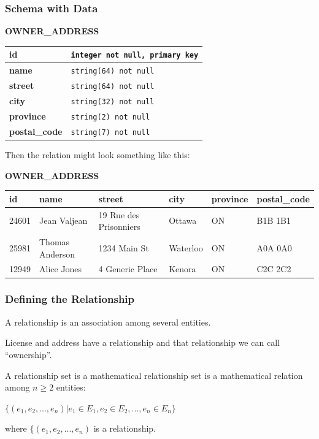 \begin{frame}
\frametitle{Schema with Data}

\begin{center}
		\textbf{OWNER\_ADDRESS}\\
	\begin{tabular}{|l|l|}\hline
		\textbf{id} & \texttt{integer not null,  primary key}\\ \hline
		\textbf{name} & \texttt{string(64) not null}\\ \hline
		\textbf{street} & \texttt{string(64) not null}\\ \hline
		\textbf{city} & \texttt{string(32) not null}\\ \hline
		\textbf{province} & \texttt{string(2) not null}\\ \hline
		\textbf{postal\_code} & \texttt{string(7) not null}\\ \hline

	\end{tabular}
\end{center}

Then the relation might look something like this:
{\scriptsize
\begin{center}
		\textbf{OWNER\_ADDRESS}\\
	\begin{tabular}{|l|l|l|l|l|l|}\hline
		\textbf{id} & \textbf{name} &\textbf{street} & \textbf{city} & \textbf{province} & \textbf{postal\_code} \\ \hline
		24601 & Jean Valjean & 19 Rue des Prisonniers & Ottawa & ON & B1B 1B1\\ \hline
		25981 & Thomas Anderson & 1234 Main St & Waterloo & ON & A0A 0A0\\ \hline
		12949 & Alice Jones & 4 Generic Place & Kenora & ON & C2C 2C2\\ \hline
	\end{tabular}
\end{center}
}
\end{frame}



\begin{frame}
\frametitle{Defining the Relationship}

A relationship is an association among several entities. 

License and address have a relationship and that relationship we can call ``ownership''.

A relationship set is a mathematical relationship set is a mathematical relation among $n \geq 2$ entities:

\begin{center}
 $\{(e_{1}, e_{2}, ..., e_{n}) | e_{1} \in E_{1}, e_{2} \in E_{2}, ..., e_{n} \in E_{n}\}$
\end{center}

where $\{(e_{1}, e_{2}, ..., e_{n})$ is a relationship.


\end{frame}




